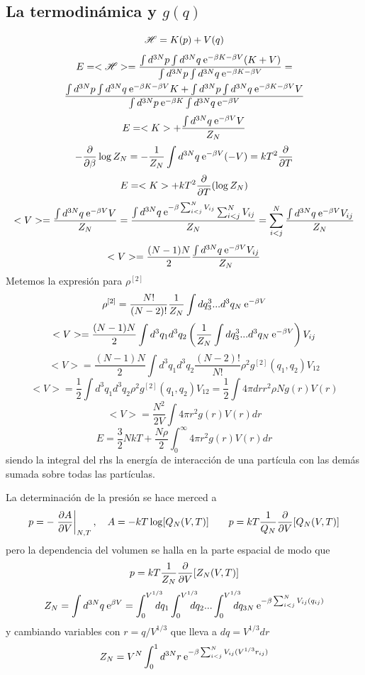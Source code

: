 \documentclass[10pt,oneside]{CBFT_book}
\begin{document}
\subsection{La termodinámica y $g(q)$}
\[
	\mathscr{H} = K(p) + V(q)
\]
\begin{multline*}
	E = <\mathscr{H}> = \frac{ \int d^{3N}p \int d^{3N}q \:\mathrm{e}^{-\beta K - \beta V} (K+V) }
	{\int d^{3N}p \int d^{3N}q \:\mathrm{e}^{-\beta K - \beta V}} = \\
	\frac{ \int d^{3N}p \int d^{3N}q \:\mathrm{e}^{-\beta K - \beta V} K + \int d^{3N}p \int d^{3N}q \:\mathrm{e}^{-\beta K - 
	\beta V} V }{ \int d^{3N}p \:\mathrm{e}^{-\beta K } \int d^{3N}q \:\mathrm{e}^{- \beta V} }
\end{multline*}
\[
	E = <K> + \frac{ \int d^{3N}q \:\mathrm{e}^{-\beta V} V }{Z_N}
\]
\[
	-\frac{\partial^{\hspace{-0.05em}} {}}{\partial {\beta}^{\hspace{-0.05em}}} \log Z_N = -\frac{1}{Z_N} \int d^{3N}q \:\mathrm{e}^{-\beta V} (-V) = kT^2 \frac{\partial^{\hspace{-0.05em}} {}}{\partial {T}^{\hspace{-0.05em}}}
\]
\[
	E = <K> + kT^2 \frac{\partial^{\hspace{-0.05em}} {}}{\partial {T}^{\hspace{-0.05em}}}(\log Z_N)
\]
\[
	<V> =  \frac{ \int d^{3N}q \:\mathrm{e}^{-\beta V} V }{Z_N} = 
	\frac{ \int d^{3N}q \:\mathrm{e}^{-\beta \sum_{i<j}^N V_{ij} } \sum_{i<j}^N V_{ij} }{Z_N} =
	\sum_{i<j}^N \frac{ \int d^{3N}q \:\mathrm{e}^{-\beta V } V_{ij} }{Z_N}
\]
\[
	<V> = \frac{(N-1)N}{2} \frac{ \int d^{3N}q \:\mathrm{e}^{-\beta V } V_{ij} }{Z_N}
\]
Metemos la expresión para $\rho^{[2]}$
\[
	\rho^{[2]} = \frac{N!}{(N-2)!} \frac{1}{Z_N} \int dq^3_3 ... d^3q_N \:\mathrm{e}^{-\beta V}
\]
\[
	<V> = \frac{(N-1)N}{2} \int d^3q_1 d^3q_2 \left( 
	\frac{1}{Z_N} \int dq^3_3 ... d^3q_N \:\mathrm{e}^{-\beta V}\right) V_{ij}
\]
\[
	<V> = \frac{(N-1)N}{2} \int d^3q_1 d^3q_2  \frac{(N-2)!}{N!}
	\rho^2 g^{[2]}(q_1,q_2) V_{12}
\]
\[
	<V> = \frac{1}{2} \int d^3q_1 d^3q_2 \rho^2 g^{[2]}(q_1,q_2) V_{12} =
	\frac{1}{2} \int 4 \pi dr r^2 \rho N  g(r) V(r)
\]
\[
	<V> = \frac{N^2}{2V} \int 4 \pi r^2 g(r) V(r) dr
\]
\[
	E = \frac{3}{2} NkT + \frac{N\rho}{2} \int_0^\infty 4 \pi r^2 g(r) V(r) dr
\]
siendo la integral del rhs la energía de interacción de una partícula con las demás sumada sobre todas las partículas.

La determinación de la presión se hace merced a 
\[
	p = -\left.\frac{\partial^{\hspace{-0.05em}} {A}}{\partial {V}^{\hspace{-0.05em}}}\right|_{N,T}, \quad A = -kT \log [Q_N(V,T)] 
	\qquad p = kT \frac{1}{Q_N} \frac{\partial^{\hspace{-0.05em}} {}}{\partial {V}^{\hspace{-0.05em}}}[Q_N(V,T)]
\]
pero la dependencia del volumen se halla en la parte espacial de modo que 
\[
	p = kT \frac{1}{Z_N} \frac{\partial^{\hspace{-0.05em}} {}}{\partial {V}^{\hspace{-0.05em}}}[ Z_N(V,T) ]  
\]
\[
	Z_N = \int d^{3N}q \euler^{\beta V}  = 
	\int_0^{V^{1/3}} \hspace*{-1em} dq_1 \int_0^{V^{1/3}} \hspace*{-1em} dq_2 ... \int_0^{V^{1/3}} 
	\hspace*{-1em} dq_{3N} \euler^{-\beta \sum_{i<j}^N V_{ij}(q_{ij}) }
\]
y cambiando variables con $ r = q/V^{1/3} $ que lleva a $ dq = V^{1/3} dr $
\[
	Z_N = V^N \int_0^1 d^{3N}r \:\mathrm{e}^{-\beta \sum_{i<j}^N V_{ij}(V^{1/3}r_{ij}) }
\]


\end{document}
